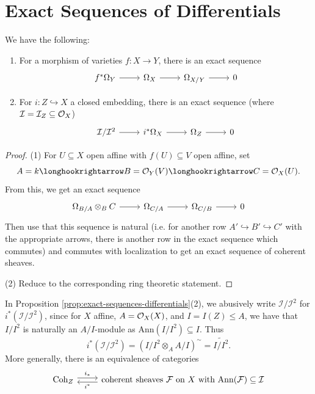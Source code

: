 \section{Exact Sequences of Differentials}
\begin{prop}\label{prop:exact-sequences-differentials}
  We have the following:
  \begin{enumerate}
    \item For a morphism of varieties
      $f : X \to Y$, there is an exact sequence
      \[
        \begin{tikzcd}
          f^* \Omega_Y
          \ar[r] & \Omega_X
          \ar[r] & \Omega_{X / Y}
          \ar[r] & 0
        \end{tikzcd}
      \]
    \item For $i : Z \hookrightarrow X$
      a closed embedding, there is an
      exact sequence
      (where $\mathcal{I} = \mathcal{I}_Z \subseteq \mathcal{O}_X$)
      \[
        \begin{tikzcd}
          \mathcal{I} / \mathcal{I}^2
          \ar[r] & i^* \Omega_X
          \ar[r] & \Omega_Z
          \ar[r] & 0
        \end{tikzcd}
      \]
  \end{enumerate}
\end{prop}

\begin{proof}
  (1) For $U \subseteq X$ open affine with
  $f(U) \subseteq V$ open affine, set
  \[
    A = k \longhookrightarrow B = \OO_Y(V)
    \longhookrightarrow C = \OO_X(U).
  \]
  From this, we get an exact sequence
  \[
    \begin{tikzcd}
      \Omega_{B / A} \otimes_B C
      \ar[r] & \Omega_{C / A}
      \ar[r] & \Omega_{C / B}
      \ar[r] & 0
    \end{tikzcd}
  \]
  Then use that this sequence is natural
  (i.e. for another row $A' \hookrightarrow B' \hookrightarrow C'$ with the
  appropriate arrows, there is another
  row in the exact sequence which
  commutes)
  and commutes with localization
  to get an exact sequence of coherent
  sheaves.

  (2) Reduce to the corresponding
  ring theoretic statement.
\end{proof}

\begin{remark}
  In Proposition \ref{prop:exact-sequences-differentials}(2),
  we abusively write
  $\mathcal{I} / \mathcal{I}^2$ for
  $i^*(\mathcal{I} / \mathcal{I}^2)$, since
  for $X$ affine,
  $A = \mathcal{O}_X(X)$, and $I = I(Z) \le A$,
  we have that $I / I^2$ is naturally
  an $A / I$-module as $\mathrm{Ann}(I / I^2) \subseteq I$.
  Thus
  \[
    i^*(\mathcal{I} / \mathcal{I}^2)
    = (I / I^2 \otimes_A A / I)^\sim
    = \widetilde{I / I^2}.
  \]
  More generally, there is an equivalence
  of categories
  \[
    \begin{tikzcd}
      \Coh_Z \ar[r, shift left=1, "i_*"] & \text{coherent sheaves $\mathcal{F}$ on $X$ with $\mathrm{Ann}(\mathcal{F}) \subseteq \mathcal{I}$} \ar[l, shift left=1, "i^*"]
    \end{tikzcd}
  \]
\end{remark}

